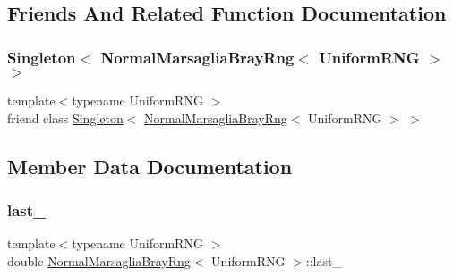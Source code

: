 \subsection{Friends And Related Function Documentation}
\hypertarget{class_normal_marsaglia_bray_rng_aa99df0c9327941ffb3d6995b103ce8c0}{}\label{class_normal_marsaglia_bray_rng_aa99df0c9327941ffb3d6995b103ce8c0} 
\subsubsection{\texorpdfstring{Singleton$<$ Normal\+Marsaglia\+Bray\+Rng$<$ Uniform\+R\+N\+G $>$ $>$}{Singleton< NormalMarsagliaBrayRng< UniformRNG > >}}
{\footnotesize\ttfamily template$<$typename Uniform\+R\+NG $>$ \\
friend class \hyperlink{class_singleton}{Singleton}$<$ \hyperlink{class_normal_marsaglia_bray_rng}{Normal\+Marsaglia\+Bray\+Rng}$<$ Uniform\+R\+NG $>$ $>$\hspace{0.3cm}{\ttfamily [friend]}}



\subsection{Member Data Documentation}
\hypertarget{class_normal_marsaglia_bray_rng_a39a4a809c38812b344b3695b915133c6}{}\label{class_normal_marsaglia_bray_rng_a39a4a809c38812b344b3695b915133c6} 
\subsubsection{\texorpdfstring{last\+\_\+}{last\_}}
{\footnotesize\ttfamily template$<$typename Uniform\+R\+NG $>$ \\
double \hyperlink{class_normal_marsaglia_bray_rng}{Normal\+Marsaglia\+Bray\+Rng}$<$ Uniform\+R\+NG $>$\+::last\+\_\+\hspace{0.3cm}{\ttfamily [private]}}



